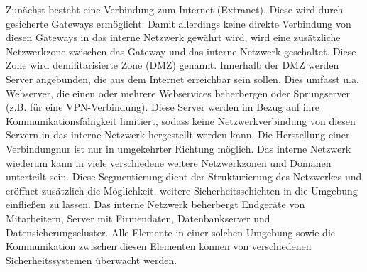 Zunächst besteht eine Verbindung zum Internet (Extranet). Diese wird durch gesicherte Gateways ermöglicht. Damit allerdings keine direkte Verbindung von diesen Gateways in das interne Netzwerk gewährt wird, wird eine zusätzliche Netzwerkzone zwischen das Gateway und das interne Netzwerk geschaltet. Diese Zone wird demilitarisierte Zone (DMZ) genannt. Innerhalb der DMZ werden Server angebunden, die aus dem Internet erreichbar sein sollen. Dies umfasst u.a. Webserver, die einen oder mehrere Webservices beherbergen oder Sprungserver (z.B. für eine VPN-Verbindung). Diese Server werden im Bezug auf ihre Kommunikationsfähigkeit limitiert, sodass keine Netzwerkverbindung von diesen Servern in das interne Netzwerk hergestellt werden kann. Die Herstellung einer Verbindungnur ist nur in umgekehrter Richtung möglich. Das interne Netzwerk wiederum kann in viele verschiedene weitere Netzwerkzonen und Domänen unterteilt sein. Diese Segmentierung dient der Strukturierung des Netzwerkes und eröffnet zusätzlich die Möglichkeit, weitere Sicherheitsschichten in die Umgebung einfließen zu lassen. Das interne Netzwerk beherbergt Endgeräte von Mitarbeitern, Server mit Firmendaten, Datenbankserver und Datensicherungscluster. Alle Elemente in einer solchen Umgebung sowie die Kommunikation zwischen diesen Elementen können von verschiedenen Sicherheitssystemen überwacht werden. 

